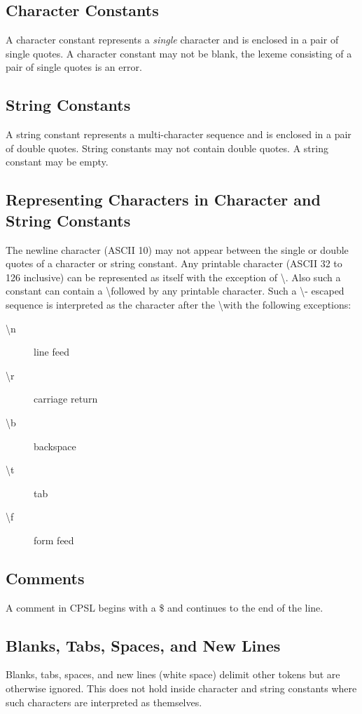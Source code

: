 \documentclass{book}
\begin{document}
\subsection{Character Constants}
A character constant represents a \textit{single} character and is enclosed in a pair of single quotes.  A character constant may not be blank, the lexeme consisting of a pair of single quotes is an error.
\subsection{String Constants}
A string constant represents a multi-character sequence and is enclosed in a pair of double quotes. String constants may not contain double quotes.
A string constant may be empty.
\subsection{Representing Characters in Character and String Constants}
The newline character (ASCII 10) may not appear between the single or double quotes of a character or string constant.
Any printable character (ASCII 32 to 126 inclusive) can be represented
as itself with the exception of \textbackslash.
Also such a constant can contain a \textbackslash followed by any printable character.  Such a \textbackslash - escaped sequence is interpreted as the character after the \textbackslash with the following exceptions:
\begin{description}
\item[\textbackslash n] line feed
\item[\textbackslash r] carriage return
\item[\textbackslash b] backspace
\item[\textbackslash t] tab
\item[\textbackslash f] form feed 
\end{description}

\subsection{Comments}
A comment in CPSL begins with a \$ and continues to the end of the line.
\subsection{Blanks, Tabs, Spaces, and New Lines}
Blanks, tabs, spaces, and new lines (white space) delimit other tokens but are otherwise ignored.  This does not hold inside character and string constants where such characters are interpreted as themselves.
\end{document}
